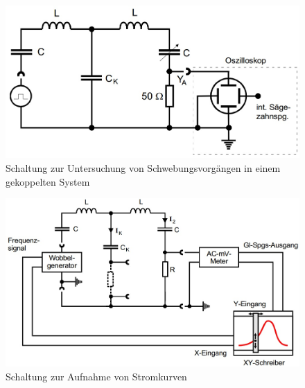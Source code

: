 \begin{figure}[h]
        \centering
        \includegraphics[scale=0.5]{Grafiken/V355Abb3.jpg}
        \caption{Schaltung zur Untersuchung von Schwebungsvorgängen in einem gekoppelten System}
        \label{fig:Abb3}
\end{figure}
\begin{figure}[h]
        \centering
        \includegraphics[scale=0.5]{Grafiken/V355Abb4.jpg}
        \caption{Schaltung zur Aufnahme von Stromkurven}
        \label{fig:Abb4}
\end{figure}
